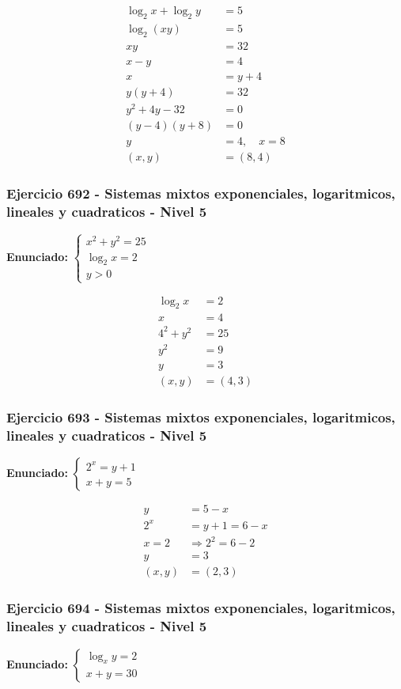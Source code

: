 \documentclass[12pt,a4paper]{article}
\begin{document}
\[
\begin{aligned}
\log_2x+\log_2y&=5\\
\log_2(xy)&=5\\
xy&=32\\
x-y&=4\\
x&=y+4\\
y(y+4)&=32\\
y^2+4y-32&=0\\
(y-4)(y+8)&=0\\
y&=4,
\quad x=8\\
(x,y)&=\boxed{(8,4)}
\end{aligned}
\]


\subsubsection*{Ejercicio 692 - Sistemas mixtos exponenciales, logaritmicos, lineales y cuadraticos - Nivel 5}
\textbf{Enunciado:} \(\begin{cases}x^2+y^2=25\\ \log_2x=2\\ y>0\end{cases}\)

\[
\begin{aligned}
\log_2x&=2\\
x&=4\\
4^2+y^2&=25\\
y^2&=9\\
y&=3\\
(x,y)&=\boxed{(4,3)}
\end{aligned}
\]


\subsubsection*{Ejercicio 693 - Sistemas mixtos exponenciales, logaritmicos, lineales y cuadraticos - Nivel 5}
\textbf{Enunciado:} \(\begin{cases}2^x=y+1\\ x+y=5\end{cases}\)

\[
\begin{aligned}
y&=5-x\\
2^x&=y+1=6-x\\
x=2&\Rightarrow 2^2=6-2\\
y&=3\\
(x,y)&=\boxed{(2,3)}
\end{aligned}
\]


\subsubsection*{Ejercicio 694 - Sistemas mixtos exponenciales, logaritmicos, lineales y cuadraticos - Nivel 5}
\textbf{Enunciado:} \(\begin{cases}\log_xy=2\\ x+y=30\end{cases}\)
\end{document}
